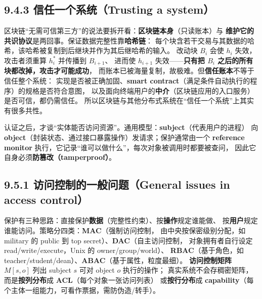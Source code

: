 
\subsection*{9.4.3 信任一个系统（Trusting a system）}
区块链“无需可信第三方”的说法要拆开看：\textbf{区块链本身}（只读账本）与
\textbf{维护它的共识协议}是两回事。保证数据完整性靠\textbf{哈希链}：
每个块含若干交易与其数据的哈希，该哈希被复制到后继块并作为其后继哈希的输入。
改动块 $B_i$ 会使 $h_i$ 失效，攻击者须重算 $h_i^*$ 并传播到 $B_{i+1}$、
进而使 $h_{i+1}$ 失效——\textbf{只有把 $B_i$ 之后的所有块都改掉，攻击才可能成功}，
而账本已被海量复制，故极难。但\textbf{信任账本}不等于信任整个系统：
实现是否被正确加固、\textbf{smart contract}（满足条件自动执行的程序）的规格是否符合意图，
以及面向终端用户的\textbf{中介}（区块链应用的入口服务）是否可信，都仍需信任。
所以区块链与其他分布式系统在“信任一个系统”上其实有很多共性。

\begin{closeread}
\end{closeread}



认证之后，才谈“实体能否访问资源”。通用模型：\textbf{subject}（代表用户的进程）
向 \textbf{object}（封装状态、通过接口暴露操作）发请求；保护通常由一个
\textbf{reference monitor} 执行，它记录“谁可以做什么”，每次对象被调用时都要被查问，
因此它自身必须\textbf{防篡改（tamperproof）}。

\subsection*{9.5.1 访问控制的一般问题（General issues in access control）}
保护有三种思路：直接保护\textbf{数据}（完整性约束）、按\textbf{操作}规定谁能做、
按\textbf{用户}规定谁能访问。策略分四类：\textbf{MAC}（强制访问控制，
由中央按保密级别分配，如 military 的 public 到 top secret）、\textbf{DAC}（自主访问控制，
对象拥有者自行设定 read/write/execute，Unix 的 owner/group/world）、
\textbf{RBAC}（基于角色，如 teacher/student/dean）、\textbf{ABAC}（基于属性，粒度最细）。
\textbf{访问控制矩阵} $M[s,o]$ 列出 subject $s$ 可对 object $o$ 执行的操作；
真实系统不会存稠密矩阵，而是\textbf{按列分布}成 \textbf{ACL}（每个对象一张访问列表）
或\textbf{按行分布}成 \textbf{capability}（每个主体一组能力，可看作票据，需防伪造/转手）。

